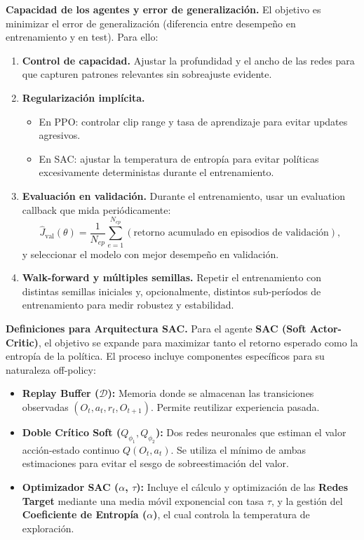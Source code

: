 \documentclass[12pt]{article}
\begin{document}
\textbf{Capacidad de los agentes y error de generalización.}
El objetivo es minimizar el error de generalización (diferencia entre desempeño en entrenamiento y en test). Para ello:
\begin{enumerate}
    \item \textbf{Control de capacidad.} Ajustar la profundidad y el ancho de las redes para que capturen patrones relevantes sin sobreajuste evidente.
    \item \textbf{Regularización implícita.} 
    \begin{itemize}
        \item En PPO: controlar clip range y tasa de aprendizaje para evitar updates agresivos.
        \item En SAC: ajustar la temperatura de entropía para evitar políticas excesivamente deterministas durante el entrenamiento.
    \end{itemize}
    \item \textbf{Evaluación en validación.} Durante el entrenamiento, usar un evaluation callback que mida periódicamente:
    $$\hat{J}_{\text{val}}(\theta) = \frac{1}{N_{ep}} \sum_{e=1}^{N_{ep}} (\text{retorno acumulado en episodios de validación}),$$
    y seleccionar el modelo con mejor desempeño en validación.
    \item \textbf{Walk-forward y múltiples semillas.} Repetir el entrenamiento con distintas semillas iniciales y, opcionalmente, distintos sub-períodos de entrenamiento para medir robustez y estabilidad.
\end{enumerate}


\vspace{0.5cm}
\textbf{Definiciones para Arquitectura SAC.} 
Para el agente \textbf{SAC (Soft Actor-Critic)}, el objetivo se expande para maximizar tanto el retorno esperado como la entropía de la política. El proceso incluye componentes específicos para su naturaleza off-policy:
\begin{itemize}
    \item \textbf{Replay Buffer ($\mathcal{D}$):} Memoria donde se almacenan las transiciones observadas $(O_t, a_t, r_t, O_{t+1})$. Permite reutilizar experiencia pasada.
    \item \textbf{Doble Crítico Soft ($Q_{\phi_1}, Q_{\phi_2}$):} Dos redes neuronales que estiman el valor acción-estado continuo $Q(O_t, a_t)$. Se utiliza el mínimo de ambas estimaciones para evitar el sesgo de sobreestimación del valor.
    \item \textbf{Optimizador SAC ($\alpha$, $\tau$):} Incluye el cálculo y optimización de las \textbf{Redes Target} mediante una media móvil exponencial con tasa $\tau$, y la gestión del \textbf{Coeficiente de Entropía ($\alpha$)}, el cual controla la temperatura de exploración.
\end{itemize}
\end{document}
